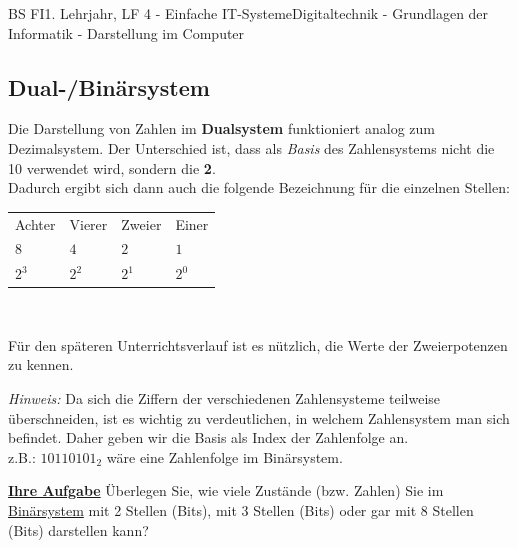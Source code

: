 \documentclass[11pt,twocolumn,oneside,openany,headings=optiontotoc,11pt,numbers=noenddot]{article}
\begin{document}
\begin{worksheet}{BS FI}{1. Lehrjahr, LF 4 - Einfache IT-Systeme}{Digitaltechnik - Grundlagen der Informatik - Darstellung im Computer}
		\subsection*{Dual-/Binärsystem}
		Die Darstellung von Zahlen im \textbf{Dualsystem} funktioniert analog zum Dezimalsystem. Der Unterschied ist, dass als \textit{Basis} des Zahlensystems nicht die 10 verwendet wird, sondern die \textbf{2}.\\
		Dadurch ergibt sich dann auch die folgende Bezeichnung für die einzelnen Stellen:\\
		\par\noindent
		\begin{tabularx}{0.48\textwidth}{MMMM}
			\grqq{}Achter\grqq{} & \grqq{}Vierer\grqq{} & \grqq{}Zweier\grqq{} & \grqq{}Einer\grqq{}\\
			\(8\) & \(4\) & \(2\) & \(1\)\\
			\(2^3\) & \(2^2\) & \(2^1\) & \(2^0\)
		\end{tabularx}\\
		\par\noindent
		Für den späteren Unterrichtsverlauf ist es nützlich, die Werte der Zweierpotenzen zu kennen.
		\par\noindent
		\textit{Hinweis:} Da sich die Ziffern der verschiedenen Zahlensysteme teilweise überschneiden, ist es wichtig zu verdeutlichen, in welchem Zahlensystem man sich befindet. Daher geben wir die Basis als Index der Zahlenfolge an.\\
		z.B.: \(10110101_2\) wäre eine Zahlenfolge im Binärsystem.\\
		\par\noindent
		\textbf{\underline{Ihre Aufgabe}} Überlegen Sie, wie viele Zustände (bzw. Zahlen) Sie im \underline{Binärsystem} mit 2 Stellen (Bits), mit 3 Stellen (Bits) oder gar mit 8 Stellen (Bits) darstellen kann?

\end{worksheet}
\end{document}
